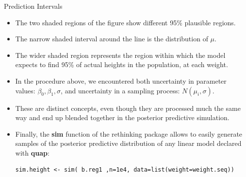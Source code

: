 \documentclass[handout]{beamer}
\begin{document}
\begin{frame}[fragile]{Prediction Intervals}
\scriptsize{
\begin{itemize}


\item The two shaded regions of the figure show different 95\% plausible regions. 

\item The narrow shaded interval around the line is the
distribution of $\mu$. 
\item The wider shaded region represents the region within which the model expects to find 95\% of actual heights in the population, at each weight.

\item In the procedure above, we encountered both uncertainty in parameter values: $\beta_0,\beta_1,\sigma$, and uncertainty in a sampling process: $N(\mu_i,\sigma)$. 

\item These are distinct concepts, even though they are processed much the same way and end up blended together in the posterior predictive simulation.

\item Finally, the \textbf{sim} function of the rethinking package allows to easily generate samples of the posterior predictive distribution of any linear model declared with \textbf{quap}:

\begin{verbatim}
sim.height <- sim( b.reg1 ,n=1e4, data=list(weight=weight.seq))

\end{verbatim}



\end{itemize}
 

 
}
\end{frame}
\end{document}
